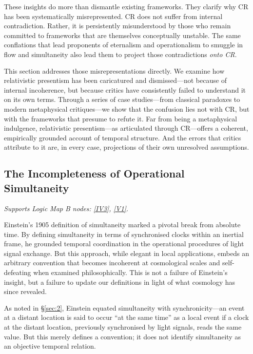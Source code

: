 \documentclass[12pt]{book}
\begin{document}
These insights do more than dismantle existing frameworks. They clarify why CR has been systematically misrepresented. CR does not suffer from internal contradiction. Rather, it is persistently misunderstood by those who remain committed to frameworks that are themselves conceptually unstable. The same conflations that lead proponents of eternalism and operationalism to smuggle in flow and simultaneity also lead them to project those contradictions \textit{onto CR}. 

This section addresses those misrepresentations directly. We examine how relativistic presentism has been caricatured and dismissed---not because of internal incoherence, but because critics have consistently failed to understand it on its own terms. Through a series of case studies---from classical paradoxes to modern metaphysical critiques---we show that the confusion lies not with CR, but with the frameworks that presume to refute it. Far from being a metaphysical indulgence, relativistic presentism---as articulated through CR---offers a coherent, empirically grounded account of temporal structure. And the errors that critics attribute to it are, in every case, projections of their own unresolved assumptions.

\subsection{The Incompleteness of Operational Simultaneity}\label{sec:5.3.1}
\noindent\textit{Supports Logic Map B nodes: \hyperref[appendix:IV3]{[IV3]}, \hyperref[appendix:V1]{[V1]}.}

\vspace{4pt}

Einstein's 1905 definition of simultaneity marked a pivotal break from absolute time. By defining simultaneity in terms of synchronised clocks within an inertial frame, he grounded temporal coordination in the operational procedures of light signal exchange. But this approach, while elegant in local applications, embeds an arbitrary convention that becomes incoherent at cosmological scales and self-defeating when examined philosophically. This is not a failure of Einstein's insight, but a failure to update our definitions in light of what cosmology has since revealed.

As noted in \S\ref{sec:2}, Einstein equated simultaneity with synchronicity---an event at a distant location is said to occur ``at the same time'' as a local event if a clock at the distant location, previously synchronised by light signals, reads the same value. But this merely defines a convention; it does not identify simultaneity as an objective temporal relation.
\end{document}
